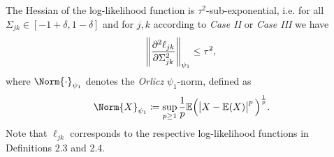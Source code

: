 \begin{condition}\label{Hessian statistical noise}
    The Hessian of the log-likelihood function is $\tau^2$-sub-exponential, i.e. for all $\Sigma_{jk} \in [-1+\delta, 1-\delta]$ and for $j,k$ according to \textit{Case II} or \textit{Case III} we have
    \begin{equation}
        \norm{\frac{\partial^2\ell_{jk}}{\partial \Sigma_{jk}^{2}}}_{\psi_{1}} \leq \tau^2,
    \end{equation}
    where $\Norm{\cdot}_{\psi_{1}}$ denotes the \textit{Orlicz} $\psi_{1}$-norm, defined as
    \begin{equation*}
        \Norm{X}_{\psi_{1}} \coloneqq \sup_{p\geq 1} \frac{1}{p}\mathbb{E}\Big(\abs{X - \mathbb{E}(X)}^p\Big)^{\frac{1}{p}}.
    \end{equation*}
    Note that $\ell_{jk}$ corresponds to the respective log-likelihood functions in Definitions 2.3 and 2.4.%


\end{condition}
